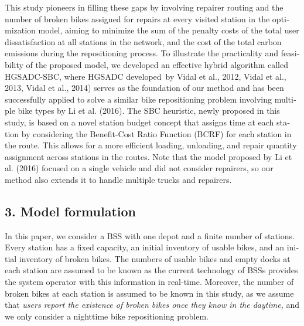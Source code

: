 \documentclass[
  english,
]{article}
\begin{document}
\begin{otherlanguage}{english}
\protect{}\label{p0145}
This study pioneers in filling these gaps by involving repairer routing and the number of broken
bikes assigned for repairs at every visited station in the optimization model, aiming to minimize
the sum of the penalty costs of the total user dissatisfaction at all stations in the network, and
the cost of the total carbon emissions during the repositioning process. To illustrate the
practicality and feasibility of the proposed model, we developed an effective hybrid algorithm
called HGSADC-SBC, where HGSADC developed~by Vidal et al., 2012, Vidal et al., 2013, Vidal et al.,
2014) serves as the foundation of our method and has been successfully applied to solve a similar
bike repositioning problem involving multiple bike types by Li et al. (2016). The SBC heuristic,
newly proposed in this study, is based on a novel station budget concept that assigns time at each
station by considering the Benefit-Cost Ratio Function (BCRF) for each station in the route. This
allows for a more efficient loading, unloading, and repair quantity assignment across stations in
the routes. Note that the model proposed by Li et al. (2016) focused on a single vehicle and did not
consider repairers, so our method also extends it to handle multiple trucks and repairers.

\protect{}\label{s0030}
\subsection{3. Model formulation}\label{st050}

\protect{}\label{p0150}
In this paper, we consider a BSS with one depot and a finite number of stations. Every station has a
fixed capacity, an initial inventory of usable bikes, and an initial inventory of broken bikes. The
numbers of usable bikes and empty docks at each station are assumed to be known as the current
technology of BSSs provides the system operator with this information in real-time. Moreover, the
number of broken bikes at each station is assumed to be known in this study, as we assume that
\emph{users report the existence of broken bikes once they know in the daytime,} and we only
consider a nighttime bike repositioning problem.


\end{otherlanguage}
\end{document}
